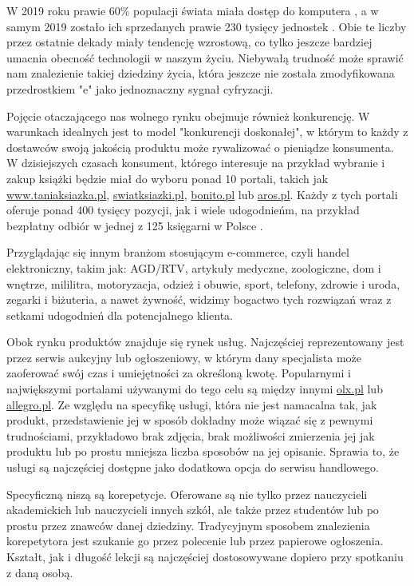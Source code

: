 \documentclass[12pt]{article}
\numberwithin{figure}{section}
\begin{document}
\begin{sloppypar}
W 2019 roku prawie 60\% populacji świata miała dostęp do komputera \cite{internet-users}, a w samym 2019 zostało ich sprzedanych prawie 230 tysięcy jednostek \cite{computers}. Obie te liczby przez ostatnie dekady miały tendencję wzrostową, co tylko jeszcze bardziej umacnia obecność technologii w naszym życiu. Niebywałą trudność może sprawić nam znalezienie takiej dziedziny życia, która jeszcze nie została zmodyfikowana przedrostkiem "e" jako jednoznaczny sygnał cyfryzacji.

Pojęcie otaczającego nas wolnego rynku obejmuje również konkurencję. W warunkach idealnych jest to model "konkurencji doskonałej", w którym to każdy z dostawców swoją jakością produktu może rywalizować o pieniądze konsumenta. W dzisiejszych czasach konsument, którego interesuje na przykład wybranie i zakup książki będzie miał do wyboru ponad 10 portali, takich jak \url{www.taniaksiazka.pl}, \url{swiatksiazki.pl}, \url{bonito.pl} lub \url{aros.pl}. Każdy z tych portali oferuje ponad 400 tysięcy pozycji, jak i wiele udogodnieńm, na przykład bezpłatny odbiór w jednej z 125 księgarni w Polsce \cite{ranking}. 

Przyglądając się innym branżom stosującym e-commerce, czyli handel elektroniczny, takim jak: AGD/RTV, artykuły medyczne, zoologiczne, dom i wnętrze, mililitra, motoryzacja, odzież i obuwie, sport, telefony, zdrowie i uroda, zegarki i biżuteria, a nawet żywność, widzimy bogactwo tych rozwiązań wraz z setkami udogodnień dla potencjalnego klienta. 

Obok rynku produktów znajduje się rynek usług. Najczęściej reprezentowany jest przez serwis aukcyjny lub ogłoszeniowy, w którym dany specjalista może zaoferować swój czas i umiejętności za określoną kwotę. Popularnymi i największymi portalami używanymi do tego celu są między innymi \url{olx.pl} lub \url{allegro.pl}.
Ze względu na specyfikę usługi, która nie jest namacalna tak, jak produkt, przedstawienie jej w sposób dokładny może wiązać się z pewnymi trudnościami, przykładowo brak zdjęcia, brak możliwości zmierzenia jej jak produktu lub po prostu mniejsza liczba sposobów na jej opisanie. Sprawia to, że usługi są najczęściej dostępne jako dodatkowa opcja do serwisu handlowego. 

Specyficzną niszą są korepetycje. Oferowane są nie tylko przez nauczycieli akademickich lub nauczycieli innych szkół, ale także przez studentów lub po prostu przez znawców danej dziedziny. Tradycyjnym sposobem znalezienia korepetytora jest szukanie go przez polecenie lub przez papierowe ogłoszenia. Kształt, jak i długość lekcji są najczęściej dostosowywane dopiero przy spotkaniu z daną osobą.


\end{sloppypar}
\end{document}
